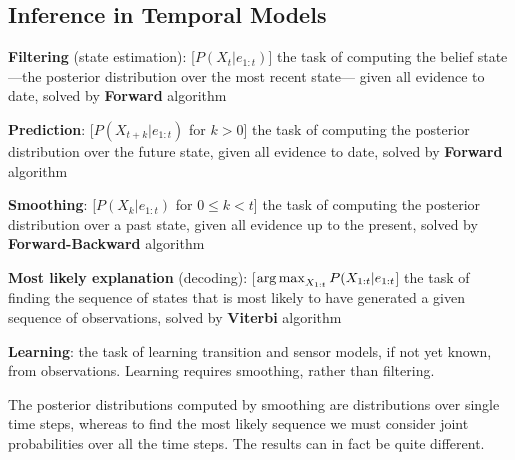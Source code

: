 \documentclass[12pt]{article}
\begin{document}
\subsection{Inference in Temporal Models}
\ulb
\item \textbf{Filtering} (state estimation): [$P(X_t|e_{1:t})$] the task of computing the belief state ---the posterior distribution over the most recent state--- given all evidence to date, solved by \textbf{Forward} algorithm
\item \textbf{Prediction}: [$P(X_{t+k}|e_{1:t})$ for $k>0$] the task of computing the posterior distribution over the future state, given all evidence to date, solved by \textbf{Forward} algorithm
\item \textbf{Smoothing}: [$P(X_{k}|e_{1:t})$ for $0 \leq k < t$] the task of computing the posterior distribution over a past state, given all evidence up to the present, solved by \textbf{Forward-Backward} algorithm
\item \textbf{Most likely explanation} (decoding): [$\operatorname*{arg\,max}_{X_{1:t}} P(X_{1:t}|e_{1:t}$] the task of finding the sequence of states that is most likely to have generated a given sequence of observations, solved by \textbf{Viterbi} algorithm
\item \textbf{Learning}: the task of learning transition and sensor models, if not yet known, from observations. Learning requires smoothing, rather than filtering.
\ule
\par The posterior distributions computed by smoothing are distributions over single time steps, whereas to find the most likely sequence we must consider joint probabilities over all the time steps. The results can in fact be quite different.
\end{document}
